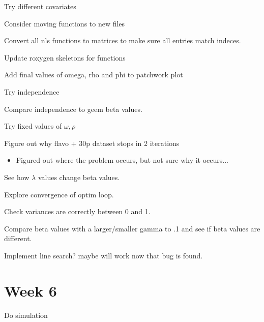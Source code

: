 \documentclass[10pt]{article}
\newcommand{\cmark}{\ding{51}}%
\newcommand{\done}{\rlap{$\square$}{\raisebox{2pt}{\large\hspace{1pt}\cmark}}%
\hspace{-2.5pt}}
\theoremstyle{definition}
\begin{document}
\begin{todolist}
  \item Try different covariates
  \item Consider moving functions to new files
  \item Convert all nls functions to matrices to make sure all entries match indeces.
  \item Update roxygen skeletons for functions
  \item Add final values of omega, rho and phi to patchwork plot
    \item[\done] Try independence
    \item Compare independence to geem beta values.
    \item Try fixed values of $\omega, \rho$
  \item[\done] Figure out why flavo + 30p dataset stops in 2 iterations
  \begin{itemize}
    \item Figured out where the problem occurs, but not sure why it occurs...
  \end{itemize}
  \item See how $\lambda$ values change beta values.
  \item Explore convergence of optim loop.
  \item Check variances are correctly between 0 and 1.
  \item Compare beta values with a larger/smaller gamma to .1 and see if beta values are different.
  \item Implement line search? maybe will work now that bug is found.

\end{todolist}


\newpage
\section{Week 6}

\begin{todolist}
  \item Do simulation
\end{todolist}


\newpage
\end{document}
